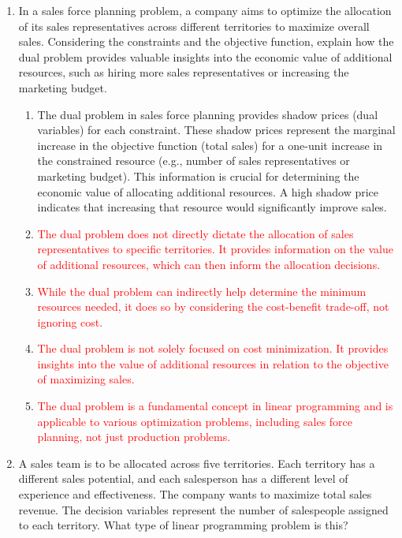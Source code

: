 \documentclass{article}%
\newcommand{\incorrect}[1]{\textcolor{red}{#1}}
\begin{document}
\begin{enumerate}
\begin{enumerate}
\item \incorrect{Answer D is incorrect. Reduced costs are always non-negative for maximization problems.}%
\item \incorrect{Answer E is incorrect. Reduced costs represent the improvement needed in the objective function to justify making a variable basic, not the direct cost.}%
\end{enumerate}%
\vspace{1em}%
\item In a sales force planning problem, a company aims to optimize the allocation of its sales representatives across different territories to maximize overall sales.  Considering the constraints and the objective function, explain how the dual problem provides valuable insights into the economic value of additional resources, such as hiring more sales representatives or increasing the marketing budget.%
\begin{enumerate}%
\item The dual problem in sales force planning provides shadow prices (dual variables) for each constraint. These shadow prices represent the marginal increase in the objective function (total sales) for a one-unit increase in the constrained resource (e.g., number of sales representatives or marketing budget).  This information is crucial for determining the economic value of allocating additional resources. A high shadow price indicates that increasing that resource would significantly improve sales.%
\item \incorrect{The dual problem does not directly dictate the allocation of sales representatives to specific territories.  It provides information on the value of additional resources, which can then inform the allocation decisions.}%
\item \incorrect{While the dual problem can indirectly help determine the minimum resources needed, it does so by considering the cost-benefit trade-off, not ignoring cost.}%
\item \incorrect{The dual problem is not solely focused on cost minimization. It provides insights into the value of additional resources in relation to the objective of maximizing sales.}%
\item \incorrect{The dual problem is a fundamental concept in linear programming and is applicable to various optimization problems, including sales force planning, not just production problems.}%
\end{enumerate}%
\vspace{1em}%
\item A sales team is to be allocated across five territories. Each territory has a different sales potential, and each salesperson has a different level of experience and effectiveness. The company wants to maximize total sales revenue.  The decision variables represent the number of salespeople assigned to each territory. What type of linear programming problem is this?%

\end{enumerate}
\end{document}
